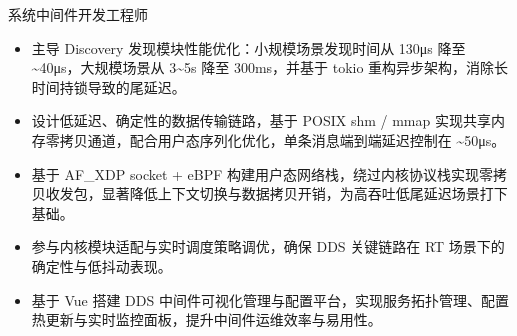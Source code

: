 \documentclass{resume}
\begin{document}
  \begin{onehalfspacing}
  系统中间件开发工程师
  \begin{itemize}
    \item 主导 Discovery 发现模块性能优化：小规模场景发现时间从 130μs 降至 \textasciitilde40μs，大规模场景从 3\textasciitilde5s 降至 300ms，并基于 tokio 重构异步架构，消除长时间持锁导致的尾延迟。
    \item 设计低延迟、确定性的数据传输链路，基于 POSIX shm / mmap 实现共享内存零拷贝通道，配合用户态序列化优化，单条消息端到端延迟控制在 \textasciitilde50μs。
    \item 基于 AF\_XDP socket + eBPF 构建用户态网络栈，绕过内核协议栈实现零拷贝收发包，显著降低上下文切换与数据拷贝开销，为高吞吐低尾延迟场景打下基础。
    \item 参与内核模块适配与实时调度策略调优，确保 DDS 关键链路在 RT 场景下的确定性与低抖动表现。
    \item 基于 Vue 搭建 DDS 中间件可视化管理与配置平台，实现服务拓扑管理、配置热更新与实时监控面板，提升中间件运维效率与易用性。
  \end{itemize}
  \end{onehalfspacing}


\end{document}
